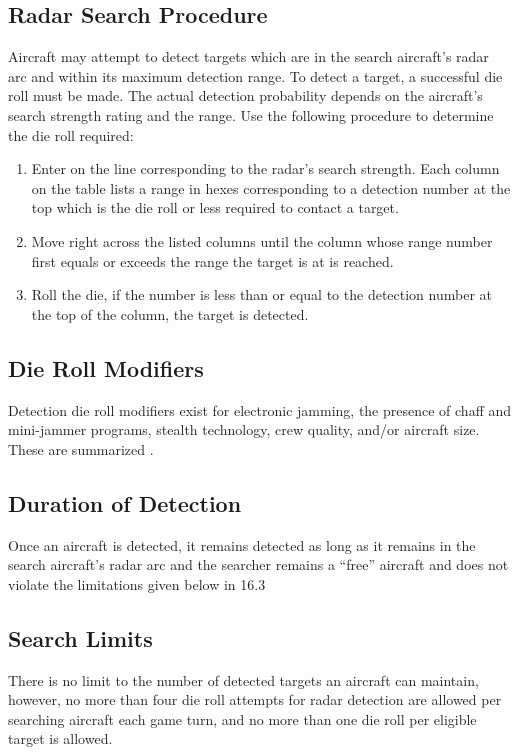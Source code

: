\subsection{Radar Search Procedure} Aircraft may attempt to detect targets which are in the search aircraft's radar arc and within its maximum detection range. To detect a target, a successful die roll must be made. The actual detection probability depends on the aircraft's search strength rating and the range. Use the following procedure to determine the die roll required:


\begin{enumerate}
    \item Enter  on the line corresponding to the radar's search strength. Each column on the table lists a range in hexes corresponding to a detection number at the top which is the die roll or less required to contact a target.
    \item Move right across the listed columns until the column whose range number first equals or exceeds the range the target is at is reached.
    \item Roll the die, if the number is less than or equal to the detection number at the top of the column, the target is detected.
\end{enumerate}

\subsection{Die Roll Modifiers} Detection die roll modifiers exist for electronic jamming, the presence of chaff and mini-jammer programs, stealth technology, crew quality, and/or aircraft size. These are summarized .

\subsection{Duration of Detection} Once an aircraft is detected, it remains detected as long as it remains in the search aircraft's radar arc and the searcher remains a “free” aircraft and does not violate the limitations given below in 16.3

\subsection{Search Limits} There is no limit to the number of detected targets an aircraft can maintain, however, no more than four die roll attempts for radar detection are allowed per searching aircraft each game turn, and no more than one die roll per eligible target is allowed.

